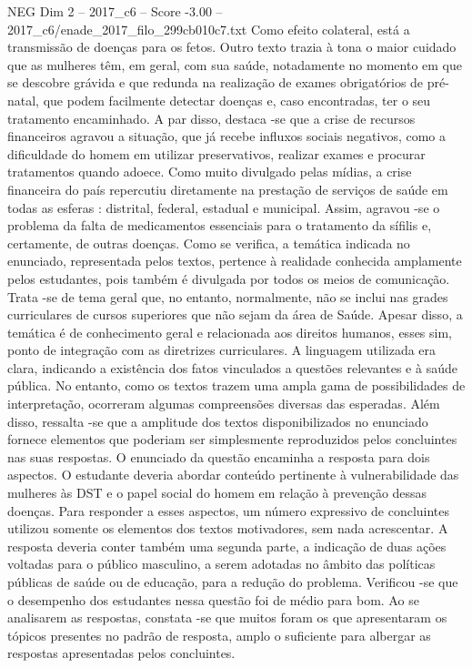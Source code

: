\begin{textsample}{NEG Dim 2 – 2017\_c6 – Score -3.00 – 2017\_c6/enade\_2017\_filo\_299cb010c7.txt}
Como efeito colateral, está a transmissão de doenças para os fetos.
Outro texto trazia à tona o maior cuidado que as mulheres têm, em geral, com sua saúde, notadamente no momento em que se descobre grávida e que redunda na realização de exames obrigatórios de pré-natal, que podem facilmente detectar doenças e, caso encontradas, ter o seu tratamento encaminhado.
A par disso, destaca -se que a crise de recursos financeiros agravou a situação, que já recebe influxos sociais negativos, como a dificuldade do homem em utilizar preservativos, realizar exames e procurar tratamentos quando adoece.
Como muito divulgado pelas mídias, a crise financeira do país repercutiu diretamente na prestação de serviços de saúde em todas as esferas : distrital, federal, estadual e municipal.
Assim, agravou -se o problema da falta de medicamentos essenciais para o tratamento da sífilis e, certamente, de outras doenças.
Como se verifica, a temática indicada no enunciado, representada pelos textos, pertence à realidade conhecida amplamente pelos estudantes, pois também é divulgada por todos os meios de comunicação.
Trata -se de tema geral que, no entanto, normalmente, não se inclui nas grades curriculares de cursos superiores que não sejam da área de Saúde.
Apesar disso, a temática é de conhecimento geral e relacionada aos direitos humanos, esses sim, ponto de integração com as diretrizes curriculares.
A linguagem utilizada era clara, indicando a existência dos fatos vinculados a questões relevantes e à saúde pública.
No entanto, como os textos trazem uma ampla gama de possibilidades de interpretação, ocorreram algumas compreensões diversas das esperadas.
Além disso, ressalta -se que a amplitude dos textos disponibilizados no enunciado fornece elementos que poderiam ser simplesmente reproduzidos pelos concluintes nas suas respostas.
O enunciado da questão encaminha a resposta para dois aspectos.
O estudante deveria abordar conteúdo pertinente à vulnerabilidade das mulheres às DST e o papel social do homem em relação à prevenção dessas doenças.
Para responder a esses aspectos, um número expressivo de concluintes utilizou somente os elementos dos textos motivadores, sem nada acrescentar.
A resposta deveria conter também uma segunda parte, a indicação de duas ações voltadas para o público masculino, a serem adotadas no âmbito das políticas públicas de saúde ou de educação, para a redução do problema.
Verificou -se que o desempenho dos estudantes nessa questão foi de médio para bom.
Ao se analisarem as respostas, constata -se que muitos foram os que apresentaram os tópicos presentes no padrão de resposta, amplo o suficiente para albergar as respostas apresentadas pelos concluintes.

\end{textsample}

